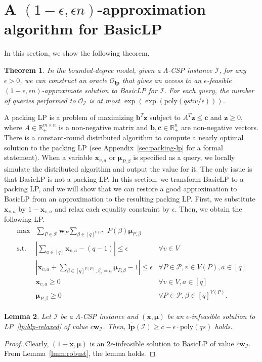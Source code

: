 \documentclass[letterpaper, 11pt]{article}
\newtheorem{theorem}{Theorem}[section]
\newtheorem{lemma}[theorem]{Lemma}
\newcommand{\calI}{\mathcal{I}}
\newcommand{\calO}{\mathcal{O}}
\newcommand{\calP}{\mathcal{P}}
\newcommand{\bbR}{\mathbb{R}}
\newcommand{\bib}{\boldsymbol{b}}
\newcommand{\bic}{\boldsymbol{c}}
\newcommand{\biw}{\boldsymbol{w}}
\newcommand{\bix}{\boldsymbol{x}}
\newcommand{\biz}{\boldsymbol{z}}
\newcommand{\bimu}{\boldsymbol{\mu}}
\newcommand{\blp}{\textsf{BasicLP}\xspace}
\newcommand{\lp}{\mathbf{lp}}
\newcommand{\ollp}{\overline{\mathbf{lp}}}
\newcommand{\poly}{\mathrm{poly}}
\begin{document}
\section{A $(1-\epsilon,\epsilon n)$-approximation algorithm for \blp}\label{sec:lp}
In this section, we show the following theorem.
\begin{theorem}\label{thr:lp}
  In the bounded-degree model, 
  given a $\Lambda$-CSP instance $\calI$,
  for any $\epsilon>0$,
  we can construct an oracle $\calO_{\lp}$ that gives an access to an $\epsilon$-feasible $(1-\epsilon,\epsilon n)$-approximate solution to \blp for $\calI$.
  For each query, the number of queries performed to $\calO_{\calI}$ is at most $\exp(\exp(\poly(qstw/\epsilon)))$.
\end{theorem}
A packing LP is a problem of maximizing $\bib^T\biz$ subject to $A^T\biz \leq \bic$ and $\biz \geq 0$,
where $A\in \bbR_+^{m \times n}$ is a non-negative matrix and $\bib, \bic\in \bbR_+^{n}$ are non-negative vectors.
There is a constant-round distributed algorithm to compute a nearly optimal solution to the packing LP (see Appendix~\ref{sec:packing-lp} for a formal statement).
When a variable $\bix_{v,a}$ or $\bimu_{P,\beta}$ is specified as a query,
we locally simulate the distributed algorithm and output the value for it.
The only issue is that \blp is not a packing LP.
In this section, we transform \blp to a packing LP, 
and we will show that we can restore a good approximation to \blp from an approximation to the resulting packing LP.
First, we substitute $\bix_{v,a}$ by $1-\bix_{v,a}$ and relax each equality constraint by $\epsilon$.
Then, we obtain the following LP.
\begin{eqnarray}
  \begin{array}{lll}
    \max & \sum\limits_{P\in \calP}\biw_P \sum\limits_{\beta\in [q]^{V(P)}}P(\beta)\bimu_{P,\beta} \\
    \mbox{s.t.} & |\sum\limits_{a\in[q]}\bix_{v,a} - (q-1) | \leq \epsilon & \forall v \in V\\    
    & | \bix_{v,a}+\sum\limits_{\beta \in [q]^{V(P)}, \beta_v=a}\bimu_{P,\beta} - 1 | \leq \epsilon & \forall P\in \calP, v\in V(P), a\in [q]\\
    & \bix_{v,a}\geq 0 & \forall v\in V,a\in[q] \\
    & \bimu_{P,\beta}\geq 0 & \forall P\in \calP, \beta\in [q]^{V(P)}.
  \end{array}
  \label{lp:blp-relaxed}
\end{eqnarray}
\begin{lemma}
  Let $\calI$ be a $\Lambda$-CSP instance and $(\bix,\bimu)$ be an $\epsilon$-infeasible solution to LP~\eqref{lp:blp-relaxed} of value $c\biw_{\calI}$.
  Then, $\ollp(\calI)\geq c-\epsilon\cdot \poly(qs)$ holds.
\end{lemma}
\begin{proof}
  Clearly, $(1-\bix,\bimu)$ is an $2\epsilon$-infeasible solution to \blp of value $c\biw_{\calI}$.
  From Lemma~\ref{lmm:robust},
  the lemma holds.
\end{proof}
\end{document}
